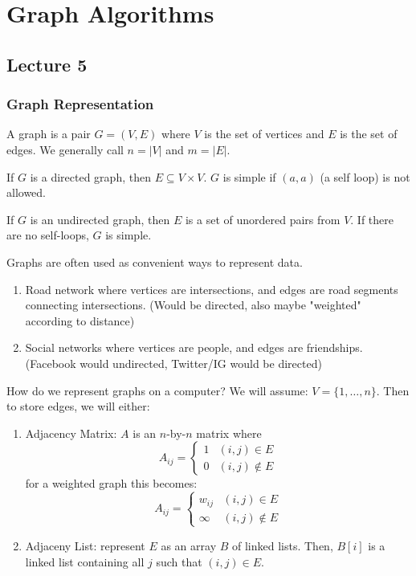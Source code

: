 \section{Graph Algorithms}

\subsection{Lecture 5}

\subsubsection{Graph Representation}

\begin{definition} [Graph]
    A graph is a pair $G = (V, E)$ where $V$ is the set of vertices and $E$
    is the set of edges. We generally call $n = |V|$ and $m = |E|$.

    If $G$ is a directed graph, then $E \subseteq V \times V$. $G$ is simple if $(a, a)$ (a self loop) is not allowed.

    If $G$ is an undirected graph, then $E$ is a set of unordered pairs from $V$. If there are no self-loops, $G$
    is simple.
\end{definition}

\begin{example} 
    Graphs are often used as convenient ways to represent data.
    \begin{enumerate}
        \item Road network where vertices are intersections, and edges are road segments connecting intersections. (Would be directed, also maybe "weighted" according to distance)
        \item Social networks where vertices are people, and edges are friendships. (Facebook would undirected, Twitter/IG would be directed)
    \end{enumerate}
\end{example}

How do we represent graphs on a computer? We will assume:
$V = \{1, \dots, n \}$. Then to store edges, we will either:
\begin{enumerate} [label=\alph*]
    \item Adjacency Matrix: $A$ is an $n$-by-$n$ matrix where 
    \[ A_{ij} = \begin{cases}
        1 & (i, j) \in E \\
        0 & (i, j) \not\in E
    \end{cases} \]
    for a weighted graph this becomes:
    \[ A_{ij} = \begin{cases}
        w_{ij} & (i, j) \in E \\
        \infty & (i, j) \not\in E
    \end{cases} \]
    \item Adjaceny List: represent $E$ as an array $B$ of linked lists.
    Then, $B[i]$ is a linked list containing all $j$ such that $(i, j) \in E$.
\end{enumerate}


